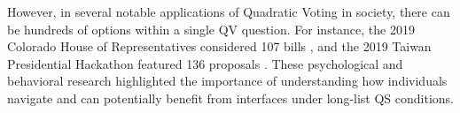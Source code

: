 However, in several notable applications of Quadratic Voting in society, there can be hundreds of options within a single QV question. For instance, the 2019 Colorado House of Representatives considered 107 bills \cite{NewWayVoting}, and the 2019 Taiwan Presidential Hackathon featured 136 proposals \cite{QuadraticVotingFrontend2022}. These psychological and behavioral research highlighted the importance of understanding how individuals navigate and can potentially benefit from interfaces under long-list QS conditions.




